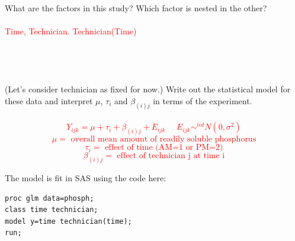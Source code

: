 What are the factors in this study?  Which factor is nested in the other?\\~\\%
\textcolor{red}{Time, Technician.  Technician(Time)}\\~\\~\\~\\~\\
(Let's consider technician as fixed for now.)  Write out the statistical model for these data and interpret $\mu$, $\tau_i$ and $\beta_{(i)j}$ in terms of the experiment.\\~\\
\textcolor{red}{$$Y_{ijk}=\mu+\tau_i+\beta_{(i)j}+E_{ijk}~~~~~~E_{ijk}\sim^{iid}N(0,\sigma^2)$$
$$\mu= \mbox{ overall mean amount of readily soluble phosphorus}$$
$$\tau_i = \mbox{ effect of time (AM=1 or PM=2)}$$
$$\beta_{(i)j}= \mbox{ effect of technician j at time i}$$
}

\newpage

The model is fit in SAS using the code here:\\
\begin{small}
\begin{verbatim}
proc glm data=phosph;
class time technician;
model y=time technician(time);
run;
\end{verbatim}
\end{small}


